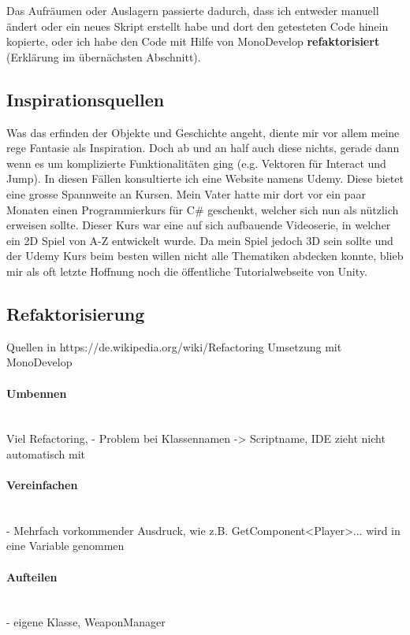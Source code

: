 Das Aufräumen oder Auslagern passierte dadurch, dass ich entweder manuell ändert oder ein neues Skript erstellt habe und dort den getesteten Code hinein kopierte, oder ich habe den Code mit Hilfe von MonoDevelop \textbf{refaktorisiert} (Erklärung im übernächsten Abschnitt). 

\subsection{Inspirationsquellen}
Was das erfinden der Objekte und Geschichte angeht, diente mir vor allem meine rege Fantasie als Inspiration.
Doch ab und an half auch diese nichts, gerade dann wenn es um komplizierte Funktionalitäten 
ging (e.g. Vektoren für Interact und Jump).
In diesen Fällen konsultierte ich eine Website namens Udemy. Diese bietet eine grosse Spannweite an Kursen. Mein Vater hatte mir dort vor ein paar Monaten einen Programmierkurs für C\# geschenkt, welcher sich nun als nützlich erweisen sollte.
Dieser Kurs war eine auf sich aufbauende Videoserie, in welcher ein 2D Spiel von A-Z entwickelt wurde.
Da mein Spiel jedoch 3D sein sollte und der Udemy Kurs beim besten willen nicht alle Thematiken abdecken konnte, blieb mir als oft letzte Hoffnung noch die öffentliche Tutorialwebseite von Unity. 

\subsection{Refaktorisierung}
\label{subsubsec:refactoring}
Quellen in https://de.wikipedia.org/wiki/Refactoring
Umsetzung mit MonoDevelop
\paragraph{Umbennen}\mbox{} \\
Viel Refactoring, 
- Problem bei Klassennamen -> Scriptname, IDE zieht nicht automatisch mit

\paragraph{Vereinfachen}\mbox{} \\
- Mehrfach vorkommender Ausdruck, wie z.B. GetComponent<Player>... wird in eine Variable genommen

\paragraph{Aufteilen}\mbox{} \\
- eigene Klasse, WeaponManager

